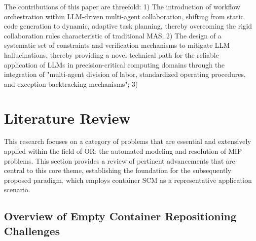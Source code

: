 \documentclass[preprint,12pt]{elsarticle}
\begin{document}
The contributions of this paper are threefold: 1) The introduction of workflow orchestration within LLM-driven multi-agent collaboration, shifting from static code generation to dynamic, adaptive task planning, thereby overcoming the rigid collaboration rules characteristic of traditional MAS; 2) The design of a systematic set of constraints and verification mechanisms to mitigate LLM hallucinations, thereby providing a novel technical path for the reliable application of LLMs in precision-critical computing domains through the integration of "multi-agent division of labor, standardized operating procedures, and exception backtracking mechanisms"; 3) 


\section{Literature Review}
This research focuses on a category of problems that are essential and extensively applied within the field of OR: the automated modeling and resolution of MIP problems. This section provides a review of pertinent advancements that are central to this core theme, establishing the foundation for the subsequently proposed paradigm, which employs container SCM as a representative application scenario. 

\subsection{Overview of Empty Container Repositioning Challenges}
\end{document}
